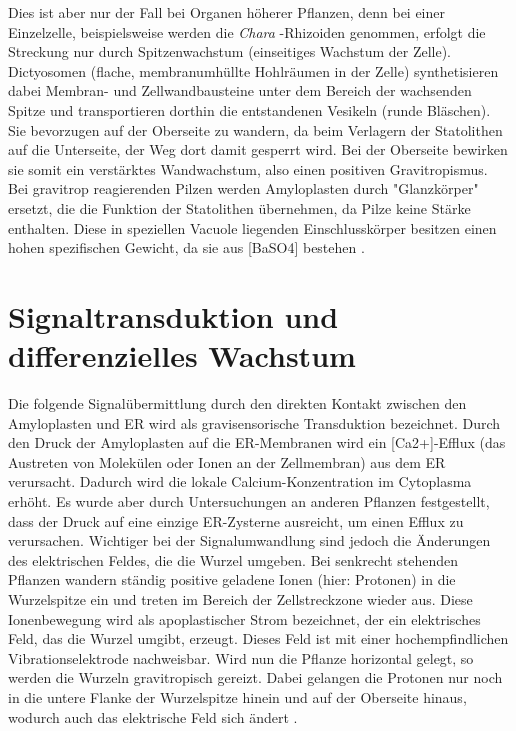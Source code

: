 \documentclass[
a4paper, 
11pt, 
ngerman,
listof=totoc,
bibliography=totocnumbered,
abstracton
]{scrreprt}
\begin{document}
Dies ist aber nur der Fall bei Organen höherer Pflanzen, denn bei einer Einzelzelle, beispielsweise werden die \emph{Chara} -Rhizoiden genommen, erfolgt die Streckung nur durch Spitzenwachstum (einseitiges Wachstum der Zelle).
Dictyosomen (flache, membranumhüllte Hohlräumen in der Zelle) synthetisieren dabei Membran- und Zellwandbausteine unter dem Bereich der wachsenden Spitze und transportieren dorthin die entstandenen Vesikeln (runde Bläschen).
Sie bevorzugen auf der Oberseite zu wandern, da beim Verlagern der Statolithen auf die Unterseite, der Weg dort damit gesperrt wird. Bei der Oberseite bewirken sie somit ein verstärktes Wandwachstum, also einen positiven Gravitropismus.
Bei gravitrop reagierenden Pilzen werden Amyloplasten durch "Glanzkörper" ersetzt, die die Funktion der Statolithen übernehmen, da Pilze keine Stärke enthalten. Diese in speziellen Vacuole liegenden Einschlusskörper besitzen einen hohen spezifischen Gewicht, da sie aus [BaSO4] bestehen \parencite[453f]{Strasburger}.




\section{Signaltransduktion und differenzielles Wachstum}

Die folgende Signalübermittlung durch den direkten Kontakt zwischen den Amyloplasten und ER wird als gravisensorische Transduktion bezeichnet.
Durch den Druck der Amyloplasten auf die ER-Membranen wird ein [Ca2+]-Efflux (das Austreten von Molekülen oder Ionen an der Zellmembran) aus dem ER verursacht.
Dadurch wird die lokale Calcium-Konzentration im Cytoplasma erhöht. 
Es wurde aber durch Untersuchungen an anderen Pflanzen festgestellt, dass der Druck auf eine einzige ER-Zysterne ausreicht, um einen Efflux zu verursachen.
Wichtiger bei der Signalumwandlung sind jedoch die Änderungen des elektrischen Feldes, die die Wurzel umgeben.
Bei senkrecht stehenden Pflanzen wandern ständig positive geladene Ionen (hier: Protonen) in die Wurzelspitze ein und treten im Bereich der Zellstreckzone wieder aus.
Diese Ionenbewegung wird als apoplastischer Strom bezeichnet, der ein elektrisches Feld, das die Wurzel umgibt, erzeugt. Dieses Feld ist mit einer hochempfindlichen Vibrationselektrode nachweisbar. 
Wird nun die Pflanze horizontal gelegt, so werden die Wurzeln gravitropisch gereizt. Dabei gelangen die Protonen nur noch in die untere Flanke der Wurzelspitze hinein und auf der Oberseite hinaus, wodurch auch das elektrische Feld sich ändert \parencite[502f]{Nultsch}.
\end{document}

